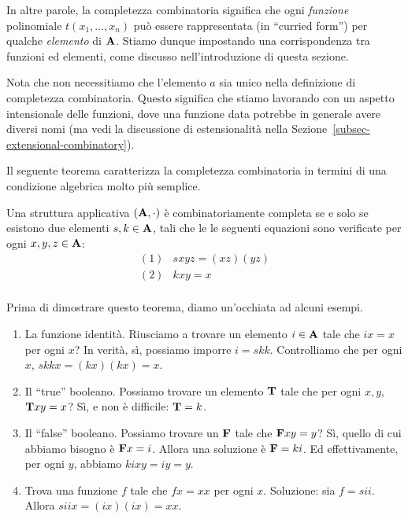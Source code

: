 \documentclass{article}
\begin{document}
In altre parole, la completezza combinatoria significa che ogni {\em funzione}
polinomiale $t(x_1,\ldots,x_n)$ pu\`o essere rappresentata (in ``curried
form'') per qualche {\em elemento} di ${\bf A}$. Stiamo dunque impostando una
corrispondenza tra funzioni ed elementi, come discusso
nell'introduzione di questa sezione.

Nota che non necessitiamo che l'elemento $a$ sia unico nella
definizione di completezza combinatoria. Questo significa che stiamo
lavorando con un aspetto intensionale delle funzioni, dove una funzione data
potrebbe in generale avere diversi nomi (ma vedi la discussione
di estensionalit\`a nella Sezione~\ref{subsec-extensional-combinatory}).

Il seguente teorema caratterizza la completezza combinatoria in termini
di una condizione algebrica molto pi\`u semplice.

\begin{theorem}\label{thm-combinatory-completeness}
  Una struttura applicativa $({\bf A},\cdot)$ \`e combinatoriamente completa se
  e solo se esistono due elementi $s,k\in {\bf A}$, tali che le
  le seguenti equazioni sono verificate per ogni $x,y,z\in{\bf A}$:
  \[ \begin{array}{ll}
    (1) & sxyz = (xz)(yz) \\
    (2) & kxy = x \\
  \end{array}
  \]
\end{theorem}

\begin{example}\label{exa-combinatory-completeness}
  Prima di dimostrare questo teorema, diamo un'occhiata ad alcuni esempi.
  \begin{enumerate}\alphalabels
  \item La funzione identit\`a. Riusciamo a trovare un elemento $i\in{\bf A}$ tale
    che $ix=x$ per ogni $x$? In verit\`a, s\`i, possiamo imporre $i=skk$. Controlliamo
    che per ogni $x$, $skkx = (kx)(kx) = x$.
  \item Il ``true'' booleano. Possiamo trovare un elemento ${\bf T}$ tale
    che per ogni $x,y$, ${\bf T} xy = x$? S\`i, e non \`e difficile: ${\bf T} = k$.
  \item Il ``false'' booleano. Possiamo trovare un ${\bf F}$ tale che
    ${\bf F} xy = y$?  S\`i, quello di cui abbiamo bisogno \`e ${\bf F} x = i$. Allora
    una soluzione \`e ${\bf F} = ki$.  Ed effettivamente, per ogni $y$, abbiamo
    $kixy = iy = y$.
  \item Trova una funzione $f$ tale che $fx = xx$ per ogni $x$. Soluzione:
    sia $f=sii$. Allora $siix = (ix)(ix) = xx$. 
  \end{enumerate}
\end{example}
\end{document}
